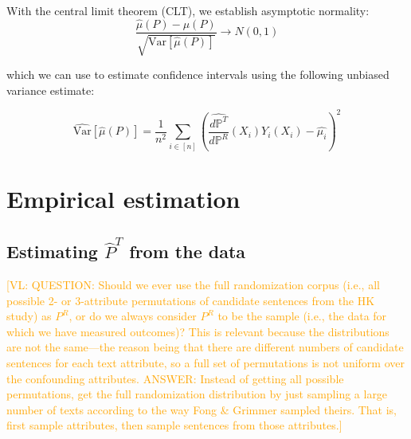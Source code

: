 \documentclass{article}
\newcommand{\vl}[1]{\textcolor{orange}{[VL: #1]}}
\begin{document}
With the central limit theorem (CLT), we establish asymptotic normality:
\begin{equation*}
    \frac{\hat{\mu}(P) - \mu(P)}{\sqrt{\text{Var}[\hat{\mu}(P)]}}\rightarrow N(0,1)
\end{equation*}

which we can use to estimate confidence intervals using the following unbiased variance estimate:

\begin{equation*}
    \widehat{\text{Var}}[\hat{\mu}(P)] = \frac{1}{n^2} \sum_{i \in [n]} \left(\frac{\hat{d \mathbb{P}^T}}{d \mathbb{P}^R}(X_i)Y_i(X_i)-\hat{\mu_i}\right)^2
\end{equation*}



\section{Empirical estimation}

\subsection{Estimating $\hat{P}^T$ from the data}

\vl{QUESTION: Should we ever use the full randomization corpus (i.e., all possible 2- or 3-attribute permutations of candidate sentences from the HK study) as $P^R$, or do we always consider $P^R$ to be the sample (i.e., the data for which we have measured outcomes)? This is relevant because the distributions are not the same---the reason being that there are different numbers of candidate sentences for each text attribute, so a full set of permutations is not uniform over the confounding attributes. 
ANSWER: Instead of getting all possible permutations, get the full randomization distribution by just sampling a large number of texts according to the way Fong \& Grimmer sampled theirs. That is, first sample attributes, then sample sentences from those attributes.}
\end{document}
